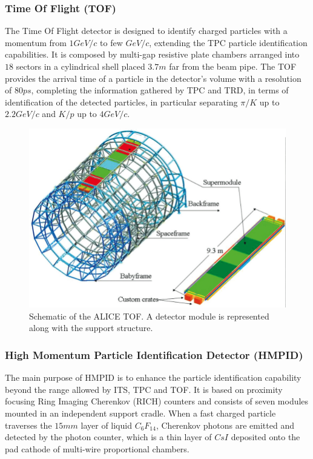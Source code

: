 \subsubsection{Time Of Flight (TOF)}
The Time Of Flight detector is designed to identify charged particles with a momentum from $1 GeV/c$ to few $GeV/c$, extending the TPC particle identification capabilities. 
It is composed by multi-gap resistive plate chambers arranged into $18$ sectors in a cylindrical shell placed $3.7 m$ far from the beam pipe. 
The TOF provides the arrival time of a particle in the detector’s volume with a resolution of $80 ps$, completing the information gathered by TPC and TRD, in terms of identification of the detected particles, in particular separating $\pi/K$ up to $2.2 GeV/c$ and $K/p$ up to $4 GeV/c$.

\begin{figure}[!h]
\begin{center}
\includegraphics[width=0.7\linewidth]{Chapters/Introduction/Figs/tof.png}
\caption{Schematic of the ALICE TOF. A detector module is represented along with the support structure.}
\label{fig:TOF}
\end{center}
\end{figure}

\subsubsection{High Momentum Particle Identification Detector (HMPID)}
The main purpose of HMPID is to enhance the particle identification capability beyond the range allowed by ITS, TPC and TOF. 
It is based on proximity focusing Ring Imaging Cherenkov (RICH) counters and consists of seven modules mounted in an independent support cradle. 
When a fast charged particle traverses the $15 mm$ layer of liquid $C_6F_{14}$, Cherenkov photons are emitted and detected by the photon counter, which is a thin layer of $CsI$ deposited onto the pad cathode of multi-wire proportional chambers.

